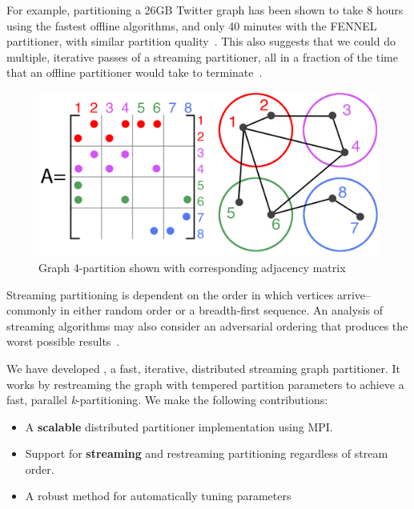 For example, partitioning a 26GB Twitter graph has been shown to take 8 hours using the fastest offline algorithms, and only 40 minutes with the FENNEL partitioner, with similar partition quality~\cite{tsourakakis2012fennel}. This also suggests that we could do multiple, iterative passes of a streaming partitioner, all in a fraction of the time that an offline partitioner would take to terminate~\cite{nishimura2013restream}.

\begin{figure}[h]
\centering
\includegraphics[width=0.85\columnwidth] {figures/graphpart1.pdf}
\caption[Caption for]{Graph 4-partition shown with corresponding adjacency matrix}
\label{fig:0}
\end{figure}

Streaming partitioning is dependent on the order in which vertices arrive-- commonly in either random order or a breadth-first sequence. An analysis of streaming algorithms may also consider an adversarial ordering that produces the worst possible results~\cite{Stanton:2012:SGP:2339530.2339722}.

We have developed \ourmethod, a fast, iterative, distributed streaming graph partitioner.
It works by restreaming the graph with tempered partition parameters to achieve a fast, parallel \textit{k}-partitioning.
We make the following contributions:
\begin{itemize}
\item A \textbf{scalable} distributed partitioner implementation using MPI.
\item Support for \textbf{streaming} and restreaming partitioning regardless of stream order.
\item A robust method for automatically tuning \ourmethod parameters 
\end{itemize}



